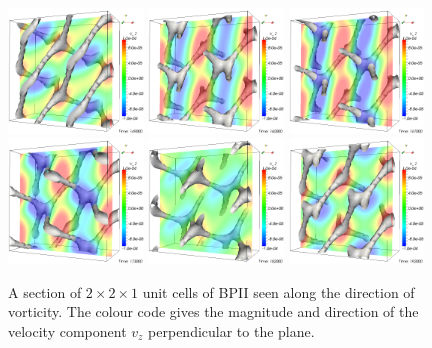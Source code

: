 \documentclass[aps,pre,twocolumn,groupedaddress]{revtex4-1}
\begin{document}
\begin{figure}[h]
\includegraphics[width=0.32\textwidth]{slice-disc-v_z-149k_run902.png}
\includegraphics[width=0.32\textwidth]{slice-disc-v_z-160k_run902.png}
\includegraphics[width=0.32\textwidth]{slice-disc-v_z-167k_run902.png}\\
\includegraphics[width=0.32\textwidth]{slice-disc-v_z-173k_run902.png}
\includegraphics[width=0.32\textwidth]{slice-disc-v_z-182k_run902.png}
\includegraphics[width=0.32\textwidth]{slice-disc-v_z-192k_run902.png}\\
\caption{A section of $2\times2\times1$ unit cells of BPII seen along the direction of vorticity. The colour code gives the magnitude and direction of the velocity component $v_z$ perpendicular to the plane.}
\label{fig2}
\end{figure}
\end{document}

